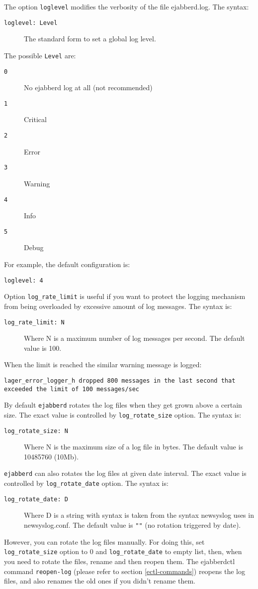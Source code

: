 \documentclass[a4paper,10pt]{book}
\newcommand{\bracehack}{\def\{{\char"7B}\def\}{\char"7D}}
\newcommand{\titem}[1]{\item[\bracehack\texttt{#1}]}
\newcommand{\term}[1]{\texttt{#1}}
\newcommand{\ejabberd}{\texttt{ejabberd}}
\begin{document}
The option \term{loglevel} modifies the verbosity of the file ejabberd.log. The syntax:
\begin{description}
    \titem{loglevel: Level} The standard form to set a global log level.
\end{description}

The possible \term{Level} are:
\begin{description}
	\titem{0} No ejabberd log at all (not recommended)
	\titem{1} Critical
	\titem{2} Error
	\titem{3} Warning
	\titem{4} Info
	\titem{5} Debug
\end{description}
For example, the default configuration is:
\begin{verbatim}
loglevel: 4
\end{verbatim}

Option \term{log\_rate\_limit} is useful if you want to protect the logging
mechanism from being overloaded by excessive amount of log messages.
The syntax is:
\begin{description}
  \titem{log\_rate\_limit: N} Where N is a maximum number of log messages per second.
  The default value is 100.
\end{description}
When the limit is reached the similar warning message is logged:
\begin{verbatim}
lager_error_logger_h dropped 800 messages in the last second that exceeded the limit of 100 messages/sec
\end{verbatim}

By default \ejabberd{} rotates the log files when they get grown above a certain size.
The exact value is controlled by \term{log\_rotate\_size} option.
The syntax is:
\begin{description}
  \titem{log\_rotate\_size: N} Where N is the maximum size of a log file in bytes.
  The default value is 10485760 (10Mb).
\end{description}

\ejabberd{} can also rotates the log files at given date interval.
The exact value is controlled by \term{log\_rotate\_date} option.
The syntax is:
\begin{description}
  \titem{log\_rotate\_date: D} Where D is a string with syntax is taken from the syntax newsyslog uses in newsyslog.conf.
  The default value is \term{""} (no rotation triggered by date).
\end{description}

However, you can rotate the log files manually.
For doing this, set \term{log\_rotate\_size} option to 0 and \term{log\_rotate\_date}
to empty list, then, when you need to rotate the files, rename and then reopen them.
The ejabberdctl command \term{reopen-log} 
(please refer to section \ref{ectl-commands})
reopens the log files,
and also renames the old ones if you didn't rename them.
\end{document}
